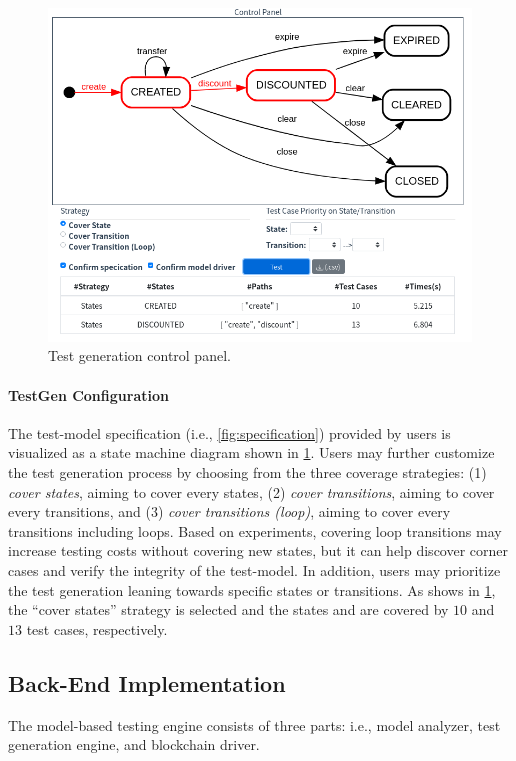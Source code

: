 \begin{figure}[t]
	\centering
	\includegraphics[width=.79\columnwidth]{Figures/Chapter3/modcon-test.png}
	\caption{Test generation control panel.}
	\label{fig:modcon-test}
\end{figure}


\paragraph{TestGen Configuration}
The test-model specification (i.e., \cref{fig:specification}) provided by users is visualized as a
state machine diagram shown in \cref{fig:modcon-test}.
Users may further customize the test generation process by choosing from the three coverage
strategies: (1) \emph{cover states}, aiming to cover every states,
(2) \emph{cover transitions}, aiming to cover every transitions, and
(3) \emph{cover transitions (loop)}, aiming to cover every transitions including loops.
Based on experiments, covering loop transitions may increase testing costs without covering new
states, but it can help discover corner cases and verify the integrity of the test-model.
In addition, users may prioritize the test generation leaning towards specific states or
transitions.
As shows in \cref{fig:modcon-test}, the ``cover states'' strategy is selected and the states
 and  are covered by $10$ and $13$ test cases, respectively.


\subsection{Back-End Implementation}
\label{sec:backend}
The model-based testing engine consists of three parts: i.e., model analyzer, test generation
engine, and blockchain driver.

